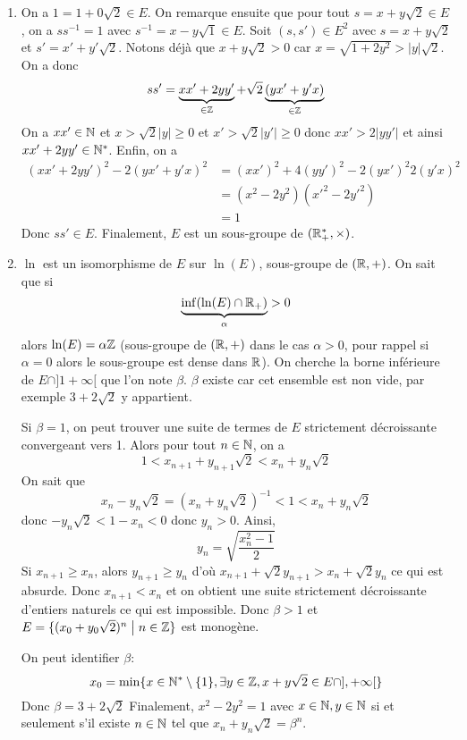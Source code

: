 \begin{solution}
	\phantom{}
	\begin{enumerate}
		\item On a $1=1+0\sqrt{2}\in E$. On remarque ensuite que pour tout $s=x+y\sqrt{2}\in E$, on a $ss^{-1}=1$ avec $s^{-1}=x-y\sqrt{1}\in E$. Soit $(s,s')\in E^{2}$ avec $s=x+y\sqrt{2}$ et $s'=x'+y'\sqrt{2}$. Notons déjà que $x+y\sqrt{2}>0$ car $x=\sqrt{1+2y^{2}}>\vert y\vert\sqrt{2}$.
		On a donc
		$$ss'=\underbrace{xx'+2yy'}_{\in\mathbb{Z}}+\sqrt{2}\underbrace{(yx'+y'x)}_{\in\mathbb{Z}}$$
		On a $xx'\in\mathbb{N}$ et $x>\sqrt{2}\vert y\vert\geqslant0$ et $x'>\sqrt{2}\vert y'\vert\geqslant0$ donc $xx'>2\vert yy'\vert$ et ainsi $xx'+2yy'\in\mathbb{N}^{*}$. Enfin, on a 
		\begin{align*}
			(xx'+2yy')^{2}-2(yx'+y'x)^{2}
			&=(xx')^{2}+4(yy')^{2}-2(yx')^{2}2(y'x)^{2}\\
			&=(x^{2}-2y^{2})(x'^{2}-2y'^{2})\\
			&=1
		\end{align*}
		Donc $ss'\in E$. Finalement, $E$ est un sous-groupe de $(\mathbb{R}_{+}^{*},\times)$.

		\item $\ln$ est un isomorphisme de $E$ sur $\ln(E)$, sous-groupe de $(\mathbb{R},+)$. On sait que si 
		$$\underbrace{\inf(\ln(E)\cap\mathbb{R}_{+})}_{\alpha}>0$$
		alors $\ln(E)=\alpha\mathbb{Z}$ (sous-groupe de $(\mathbb{R},+)$ dans le cas $\alpha>0$, pour rappel si $\alpha=0$ alors le sous-groupe est dense dans $\mathbb{R}$). On cherche la borne inférieure de $E\cap]1+\infty[$ que l'on note $\beta$. $\beta$ existe car cet ensemble est non vide, par exemple $3+2\sqrt{2}$ y appartient.
		
		Si $\beta=1$, on peut trouver une suite de termes de $E$ strictement décroissante convergeant vers 1. Alors pour tout $n\in\mathbb{N}$, on a 
		$$1<x_{n+1}+y_{n+1}\sqrt{2}<x_{n}+y_{n}\sqrt{2}$$
		On sait que 
		$$x_{n}-y_{n}\sqrt{2}=(x_{n}+y_{n}\sqrt{2})^{-1}<1<x_{n}+y_{n}\sqrt{2}$$
		donc $-y_{n}\sqrt{2}<1-x_{n}<0$ donc $y_{n}>0$. Ainsi, 
		$$y_{n}=\sqrt{\frac{x_{n}^{2}-1}{2}}$$
		Si $x_{n+1}\geqslant x_{n}$, alors $y_{n+1}\geqslant y_{n}$ d'où $x_{n+1}+\sqrt{2}y_{n+1}>x_{n}+\sqrt{2}y_{n}$ ce qui est absurde. Donc $x_{n+1}<x_{n}$ et on obtient une suite strictement décroissante d'entiers naturels ce qui est impossible. Donc $\beta>1$ et $E=\{(x_{0}+y_{0}\sqrt{2})^{n}\bigm| n\in\mathbb{Z}\}$ est monogène.

		On peut identifier $\beta$:
		$$x_{0}=\min\{x\in\mathbb{N}^{*}\setminus\{1\},\exists y\in\mathbb{Z},x+y\sqrt{2}\in E\cap],+\infty[\}$$
		Donc $\beta=3+2\sqrt{2}$ Finalement, $x^{2}-2y^{2}=1$ avec $x\in\mathbb{N},y\in\mathbb{N}$ si et seulement s'il existe $n\in\mathbb{N}$ tel que $x_{n}+y_{n}\sqrt{2}=\beta^{n}$.
	\end{enumerate}
\end{solution}

